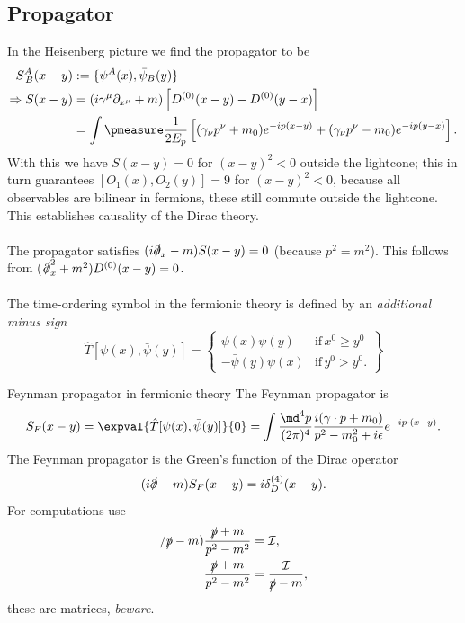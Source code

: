 \subsection{Propagator}
In the Heisenberg picture we find the propagator to be
\begin{align}
	S^A_{\,B}(x-y) &:= \{\psi^A(x), \bar{\psi}_B(y) \} \\
	\Rightarrow S(x-y) &= (i \gamma^{\mu} \partial_{x^{\mu}}+m) \left[D^{(0)}(x-y) - D^{(0)}(y-x) \right]\\
	&= \int \pmeasure \frac{1}{2 E_p} \left[(\gamma_{\nu} p^{\nu} +m_0) e^{-ip(x-y)} + (\gamma_{\nu}p^{\nu} -m_0) e^{-ip(y-x)}  \right].
\end{align}
With this we have $S(x-y)=0$ for $(x-y)^2<0$ outside the lightcone; this in turn guarantees $[O_1(x),O_2(y)]=9$ for $(x-y)^2<0$, because all observables are bilinear in fermions, these still commute outside the lightcone. This establishes causality of the Dirac theory.\\
\\ The propagator satisfies $(i \slashed{\partial}_x -m)S(x-y)=0$ (because $p^2=m^2$). This follows from ($\slashed{\partial}^2_x + m^2) D^{(0)}(x-y) =0$.
\\
\\ The time-ordering symbol in the fermionic theory is defined by an \emph{additional minus sign}
\begin{equation}
	\hat{T}[\psi(x),\bar{\psi}(y)] = \left\{\begin{array}{lr}
	\psi(x)\bar{\psi}(y) & \mathrm{if} \, x^0 \geq y^0\\
	-\bar{\psi}(y) \psi(x) & \mathrm{if} \, y^0 > y^0.
	\end{array}		\right\}
\end{equation}
\begin{mybox}{Feynman propagator in fermionic theory}
	The Feynman propagator is
	\begin{equation}
	S_F(x-y) = \expval{\hat{T}[\psi(x),\bar{\psi}(y)]}{0} = \int \frac{\md^4 p}{(2 \pi)^4} \frac{i (\gamma \cdot p +m_0)}{p^2-m^2_0 +i\epsilon} e^{-i p \cdot (x-y)}.
	\end{equation}
	The Feynman propagator is the Green's function of the Dirac operator 
	\begin{equation}
		(i \slashed{\partial} -m) S_F(x-y) = i \delta^{(4)}_D(x-y).
	\end{equation}
	For computations use
	\begin{align}
		/\slashed{p}-m) \frac{\slashed{p}+m}{p^2-m^2} &= \mathcal{I}, \\
		\frac{\slashed{p}+m}{p^2-m^2} &= \frac{\mathcal{I}}{\slashed{p} -m},
	\end{align}
these are matrices, \emph{beware}.
\end{mybox}





